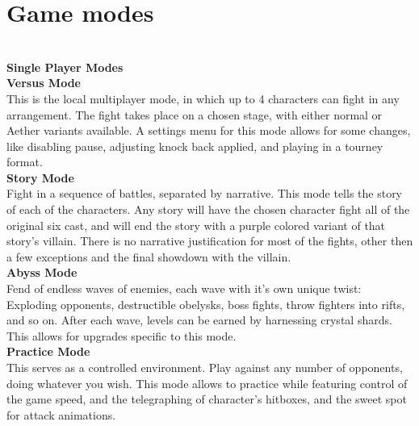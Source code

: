 \documentclass{article}
\begin{document}
\chapter{\textbf{Game modes}}\\


\textbf{Single Player Modes}\\ %

\textbf{Versus Mode}\\
This is the local multiplayer mode, in which up to 4 characters can fight in any arrangement. The fight takes place on a chosen stage, with either normal or Aether variants available. A settings menu for this mode allows for some changes, like disabling pause, adjusting knock back applied, and playing in a tourney format.
\\

\textbf{Story Mode}\\
Fight in a sequence of battles, separated by narrative. This mode tells the story of each of the characters. Any story will have the chosen character fight all of the original six cast, and will end the story with a purple colored variant of that story's villain. There is no narrative justification for most of the fights, other then a few exceptions and the final showdown with the villain.\\

\textbf{Abyss Mode}\\
Fend of endless waves of enemies, each wave with it's own unique twist: Exploding opponents, destructible obelysks, boss fights, throw fighters into rifts, and so on. After each wave, levels can be earned by harnessing crystal shards. This allows for upgrades specific to this mode.\\

\textbf{Practice Mode}\\
This serves as a controlled environment. Play against any number of opponents, doing whatever you wish. This mode allows to practice while featuring control of the game speed, and the telegraphing of character's hitboxes, and the sweet spot for attack animations.\\
\end{document}
